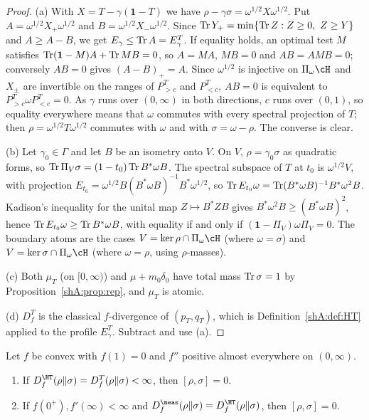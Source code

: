 \begin{proof}
(a) With $X=T-\gamma(\mathbf 1-T)$ we have $\rho-\gamma\sigma=\omega^{1/2}X\omega^{1/2}$. Put $A=\omega^{1/2}X_+\omega^{1/2}$ and $B=\omega^{1/2}X_-\omega^{1/2}$. Since $\operatorname{Tr} Y_+=\min\{\operatorname{Tr} Z:Z\ge0,\ Z\ge Y\}$ and $A\ge A-B$, we get $E_\gamma\le\operatorname{Tr} A=E^T_\gamma$. If equality holds, an optimal test $M$ satisfies $\operatorname{Tr}(\mathbf 1-M)A+\operatorname{Tr} MB=0$, so $A=MA$, $MB=0$ and $AB=AMB=0$; conversely $AB=0$ gives $(A-B)_+=A$. Since $\omega^{1/2}$ is injective on $\Pi_\omega\cH$ and $X_\pm$ are invertible on the ranges of $P^T_{>c}$ and $P^T_{<c}$, $AB=0$ is equivalent to $P^T_{>c}\omega P^T_{<c}=0$. As $\gamma$ runs over $(0,\infty)$ in both directions, $c$ runs over $(0,1)$, so equality everywhere means that $\omega$ commutes with every spectral projection of $T$; then $\rho=\omega^{1/2}T\omega^{1/2}$ commutes with $\omega$ and with $\sigma=\omega-\rho$. The converse is clear.

(b) Let $\gamma_0\in\Gamma$ and let $B$ be an isometry onto $V$. On $V$, $\rho=\gamma_0\sigma$ as quadratic forms, so $\operatorname{Tr}\Pi_V\sigma=(1-t_0)\operatorname{Tr} B^*\omega B$. The spectral subspace of $T$ at $t_0$ is $\omega^{1/2}V$, with projection $E_{t_0}=\omega^{1/2}B(B^*\omega B)^{-1}B^*\omega^{1/2}$, so $\operatorname{Tr} E_{t_0}\omega=\operatorname{Tr}(B^*\omega B)^{-1}B^*\omega^2B$. Kadison's inequality for the unital map $Z\mapsto B^*ZB$ gives $B^*\omega^2B\ge(B^*\omega B)^2$, hence $\operatorname{Tr} E_{t_0}\omega\ge\operatorname{Tr} B^*\omega B$, with equality if and only if $(\mathbf 1-\Pi_V)\omega\Pi_V=0$. The boundary atoms are the cases $V=\ker\rho\cap\Pi_\omega\cH$ (where $\omega=\sigma$) and $V=\ker\sigma\cap\Pi_\omega\cH$ (where $\omega=\rho$, using $\rho$-masses).

(c) Both $\mu_T$ (on $[0,\infty)$) and $\mu+m_0\delta_0$ have total mass $\operatorname{Tr}\sigma=1$ by Proposition~\ref{shA:prop:rep}, and $\mu_T$ is atomic.

(d) $D^T_f$ is the classical $f$-divergence of $(p_T,q_T)$, which is Definition~\ref{shA:def:HT} applied to the profile $E^T_\gamma$. Subtract and use (a).
\end{proof}

\begin{corollary}[Rigidity]\label{shA:cor:rigidity}
Let $f$ be convex with $f(1)=0$ and $f''$ positive almost everywhere on $(0,\infty)$.
\begin{enumerate}[label=(\roman*)]
\item If $D^\HT_f(\rho\|\sigma)=D^T_f(\rho\|\sigma)<\infty$, then $[\rho,\sigma]=0$.
\item If $f(0^+),f'(\infty)<\infty$ and $D^\meas_f(\rho\|\sigma)=D^\HT_f(\rho\|\sigma)$, then $[\rho,\sigma]=0$.
\end{enumerate}
\end{corollary}

